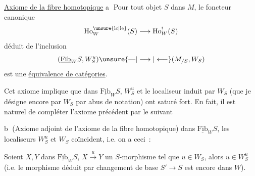 
\uline{Axiome de la fibre homotopique} \textcircled{a} Pour tout objet $S$ dans $M$, le foncteur canonique
\[
\mathrm{Ho}^{\unsure{\mathrm{lc}|\mathrm{le}}}_W(S)\longrightarrow\mathrm{Ho}^{!}_W(S)
\]
déduit de l'inclusion
\[
(\underline{\mathrm{Fib}}_W S,W_S^u)\unsure{\text{---}|\longrightarrow|\longleftarrow}(M_{/S},W_S)
\]
est une \uline{équivalence de catégories}.

Cet axiome implique que dans $\underline{\mathrm{Fib}}_W S$, $W_S^u$ et le localiseur induit par $W_S$ (que je désigne encore par $W_S$ par abus de notation) ont  saturé fort. En fait,  il est naturel de compléter l'axiome précédent par le suivant

\textcircled{b} (Axiome adjoint de l'axiome de la fibre homotopique) dans $\underline{\mathrm{Fib}}_W S$, les localiseurs $W_S^u$ et $W_S$ coïncident, i.e. on a ceci~:

Soient $X,Y$ dans $\underline{\mathrm{Fib}}_W S$, $X\xrightarrow{u}Y$ un $S$-morphisme tel que $u\in W_S$, alors $u\in W_S^u$ (i.e. le morphisme  déduit par  changement de base $S'\to S$ est encore dans $W$).

